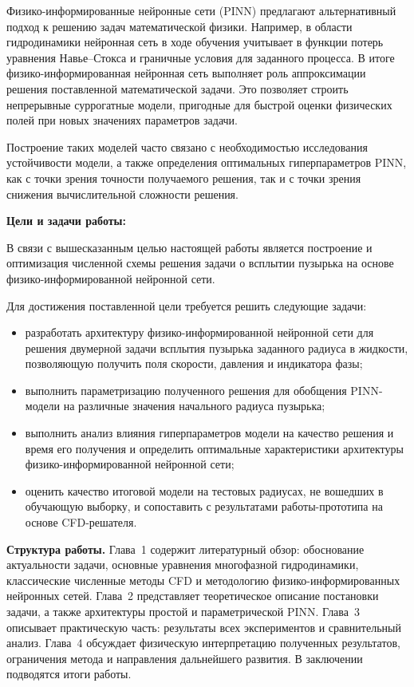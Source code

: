 Физико-информированные нейронные сети (PINN) предлагают альтернативный подход к решению задач математической физики. Например, в области гидродинамики
нейронная сеть в ходе обучения учитывает в функции потерь уравнения Навье--Стокса и граничные условия для заданного процесса. В итоге физико-информированная нейронная сеть выполняет роль аппроксимации решения поставленной математической задачи. Это позволяет строить
непрерывные суррогатные модели, пригодные для быстрой оценки физических полей
при новых значениях параметров задачи.

Построение таких моделей часто связано с необходимостью исследования устойчивости модели, а также определения оптимальных гиперпараметров PINN, как с точки зрения точности получаемого решения, так и с точки зрения снижения вычислительной сложности решения.

\medskip
\noindent\textbf{Цели и задачи работы:}

В связи с вышесказанным целью настоящей работы является построение и оптимизация численной схемы решения задачи о всплытии пузырька на основе физико-информированной нейронной сети.

Для достижения поставленной цели требуется решить следующие задачи:

\begin{itemize}
  \item разработать архитектуру физико-информированной нейронной сети для решения двумерной задачи всплытия пузырька заданного радиуса в жидкости, позволяющую получить поля скорости, давления и индикатора фазы;
  \item выполнить параметризацию полученного решения для обобщения PINN-модели на различные
        значения начального радиуса пузырька;
  \item выполнить анализ влияния гиперпараметров модели на качество решения и время его получения и определить оптимальные характеристики архитектуры физико-информированной нейронной сети;
  \item оценить качество итоговой модели на тестовых радиусах, не вошедших в
        обучающую выборку, и сопоставить с результатами работы-прототипа на основе CFD-решателя.
\end{itemize}

\medskip
\noindent\textbf{Структура работы.}
Глава~1 содержит литературный обзор: обоснование актуальности задачи,
основные уравнения многофазной гидродинамики, классические численные методы
CFD и методологию физико-информированных нейронных сетей.
Глава~2 представляет теоретическое описание постановки задачи, а также
архитектуры простой и параметрической PINN.
Глава~3 описывает практическую часть: результаты всех экспериментов и
сравнительный анализ.
Глава~4 обсуждает физическую интерпретацию полученных результатов,
ограничения метода и направления дальнейшего развития.
В заключении подводятся итоги работы.
